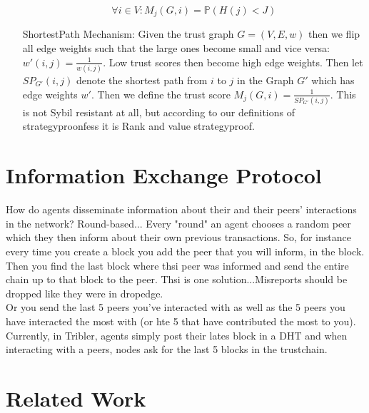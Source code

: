\documentclass[11pt,a4paper]{article}
\theoremstyle{definition}
\theoremstyle{theorem}
\theoremstyle{proposition}
\theoremstyle{corollary}
\theoremstyle{lemma}
\theoremstyle{example}
\theoremstyle{remark}
\begin{document}
\begin{enumerate}
\[
\forall i\in{}V: M_j(G,i)=\mathbb{P}(H(j)<J)
\]
\item[ShortestPath Mechanism:] Given the trust graph $G=(V,E,w)$ then we flip all edge weights such that the large ones become small and vice versa: $w'(i,j)=\frac{1}{w(i,j)}$. Low trust scores then become high edge weights. Then let $SP_{G'}(i,j)$ denote the shortest path from $i$ to $j$ in the Graph $G'$ which has edge weights $w'$. Then we define the trust score $M_j(G,i)=\frac{1}{SP_{G'}(i,j)}$. This is not Sybil resistant at all, but according to our definitions of strategyproonfess it is Rank and value strategyproof.
\end{enumerate}


\section{Information Exchange Protocol}
\label{sec:Information Exchange Protocol}
How do agents disseminate information about their and their peers' interactions in the network? Round-based... Every "round" an agent chooses a random peer which they then inform about their own previous transactions. So, for instance every time you create a block you add the peer that you will inform, in the block. Then you find the last block where thsi peer was informed and send the entire chain up to that block to the peer. Thsi is one solution...Misreports should be dropped like they were in dropedge.\vspace{1em}\\

\noindent{} Or you send the last 5 peers you've interacted with as well as the 5 peers you have interacted the most with (or hte 5 that have contributed the most to you).\vspace{1em}\\

\noindent{} Currently, in Tribler, agents simply post their lates block in a DHT and when interacting with a peers, nodes ask for the last 5 blocks in the trustchain. 


\section{Related Work}
\label{sec:Related Work}
\end{document}
